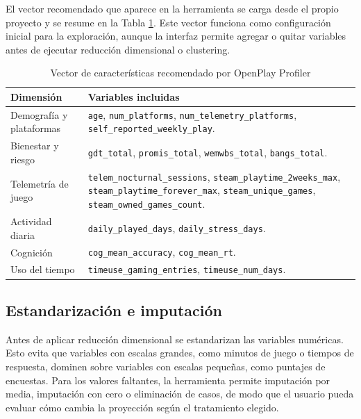 \documentclass[12pt,a4paper]{article}
\begin{document}
El vector recomendado que aparece en la herramienta se carga desde el propio proyecto y se resume en la Tabla \ref{tab:vector_recomendado}. Este vector funciona como configuraci\'on inicial para la exploraci\'on, aunque la interfaz permite agregar o quitar variables antes de ejecutar reducci\'on dimensional o clustering.

\begin{table}[H]
\centering
\caption{Vector de caracter\'isticas recomendado por OpenPlay Profiler}
\label{tab:vector_recomendado}
\begin{tabularx}{\textwidth}{p{3.2cm} X}
\toprule
\textbf{Dimensi\'on} & \textbf{Variables incluidas} \\
\midrule
Demograf\'ia y plataformas & \texttt{age}, \texttt{num\_platforms}, \texttt{num\_telemetry\_platforms}, \texttt{self\_reported\_weekly\_play}. \\
Bienestar y riesgo & \texttt{gdt\_total}, \texttt{promis\_total}, \texttt{wemwbs\_total}, \texttt{bangs\_total}. \\
Telemetr\'ia de juego & \texttt{telem\_nocturnal\_sessions}, \texttt{steam\_playtime\_2weeks\_max}, \texttt{steam\_playtime\_forever\_max}, \texttt{steam\_unique\_games}, \texttt{steam\_owned\_games\_count}. \\
Actividad diaria & \texttt{daily\_played\_days}, \texttt{daily\_stress\_days}. \\
Cognici\'on & \texttt{cog\_mean\_accuracy}, \texttt{cog\_mean\_rt}. \\
Uso del tiempo & \texttt{timeuse\_gaming\_entries}, \texttt{timeuse\_num\_days}. \\
\bottomrule
\end{tabularx}
\end{table}

\subsection{Estandarizaci\'on e imputaci\'on}

Antes de aplicar reducci\'on dimensional se estandarizan las variables num\'ericas. Esto evita que variables con escalas grandes, como minutos de juego o tiempos de respuesta, dominen sobre variables con escalas peque\~nas, como puntajes de encuestas. Para los valores faltantes, la herramienta permite imputaci\'on por media, imputaci\'on con cero o eliminaci\'on de casos, de modo que el usuario pueda evaluar c\'omo cambia la proyecci\'on seg\'un el tratamiento elegido.
\end{document}

